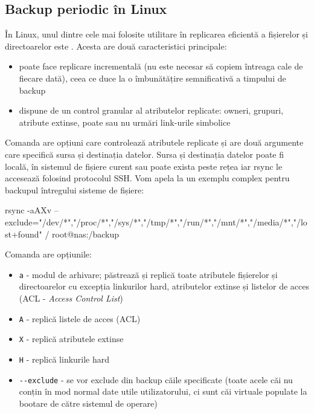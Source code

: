 \subsection{Backup periodic în Linux}
\label{sec:storage:backup:linux}

În Linux, unul dintre cele mai folosite utilitare în
replicarea eficientă a fișierelor și directoarelor este . Acesta are
două caracteristici principale:

\begin{itemize}
	\item poate face replicare incrementală (nu este necesar să copiem
		întreaga cale de fiecare dată), ceea ce duce la o îmbunătățire
		semnificativă a timpului de backup
	\item dispune de un control granular al atributelor replicate: owneri,
		grupuri, atribute extinse, poate sau nu urmări link-urile
		simbolice
\end{itemize}

Comanda  are opțiuni care controlează atributele
replicate și are două argumente care specifică sursa și destinația datelor.
Sursa și destinația datelor poate fi locală, în sistemul de fișiere curent sau
poate exista peste rețea iar rsync le accesează folosind protocolul SSH. Vom
apela la un exemplu complex pentru backupul întregului sisteme de fișiere:
\begin{screen}
rsync -aAXv --exclude={"/dev/*","/proc/*","/sys/*","/tmp/*","/run/*","/mnt/*","/media/*","/lost+found"} / root@nas:/backup
\end{screen}

Comanda  are opțiunile:

\begin{itemize}
  \item \texttt{a} - modul de arhivare; păstrează și replică toate atributele
		fișierelor și directoarelor cu excepția linkurilor hard,
                atributelor extinse și listelor de acces (ACL - \textit{Access Control List})
  \item \texttt{A} - replică listele de acces (ACL)
  \item \texttt{X} - replică atributele extinse
  \item \texttt{H} - replică linkurile hard
  \item \texttt{-{}-exclude} - se vor exclude din backup căile specificate (toate
		acele căi nu conțin în mod normal date utile utilizatorului, ci
		sunt căi virtuale populate la bootare de către sistemul de
		operare)
\end{itemize}

